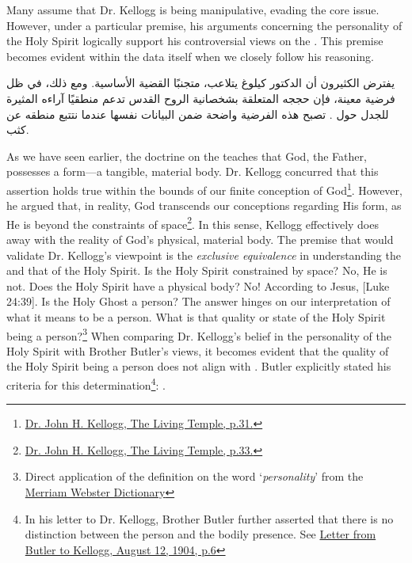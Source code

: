 Many assume that Dr. Kellogg is being manipulative, evading the core issue. However, under a particular premise, his arguments concerning the personality of the Holy Spirit logically support his controversial views on the . This premise becomes evident within the data itself when we closely follow his reasoning.


يفترض الكثيرون أن الدكتور كيلوغ يتلاعب، متجنبًا القضية الأساسية. ومع ذلك، في ظل فرضية معينة، فإن حججه المتعلقة بشخصانية الروح القدس تدعم منطقيًا آراءه المثيرة للجدل حول . تصبح هذه الفرضية واضحة ضمن البيانات نفسها عندما نتتبع منطقه عن كثب.


As we have seen earlier, the doctrine on the  teaches that God, the Father, possesses a form—a tangible, material body. Dr. Kellogg concurred that this assertion holds true within the bounds of our finite conception of God\footnote{\href{https://archive.org/details/J.H.Kellogg.TheLivingTemple1903/page/n33/}{Dr. John H. Kellogg, The Living Temple, p.31.}}. However, he argued that, in reality, God transcends our conceptions regarding His form, as He is beyond the constraints of space\footnote{\href{https://archive.org/details/J.H.Kellogg.TheLivingTemple1903/page/n33/}{Dr. John H. Kellogg, The Living Temple, p.33.}}. In this sense, Kellogg effectively does away with the reality of God’s physical, material body. The premise that would validate Dr. Kellogg’s viewpoint is the \textit{exclusive equivalence} in understanding the  and that of the Holy Spirit. Is the Holy Spirit constrained by space? No, He is not. Does the Holy Spirit have a physical body? No! According to Jesus, [Luke 24:39]. Is the Holy Ghost a person? The answer hinges on our interpretation of what it means to be a person. What is that quality or state of the Holy Spirit being a person?\footnote{Direct application of the definition on the word ‘\textit{personality}’ from the \href{https://www.merriam-webster.com/dictionary/personality}{Merriam Webster Dictionary}} When comparing Dr. Kellogg's belief in the personality of the Holy Spirit with Brother Butler's views, it becomes evident that the quality of the Holy Spirit being a person does not align with . Butler explicitly stated his criteria for this determination\footnote{In his letter to Dr. Kellogg, Brother Butler further asserted that there is no distinction between the person and the bodily presence. See \href{https://c7da.us/egwdl/Butler\%20to\%20Kellogg\%20Aug121904.pdf}{Letter from Butler to Kellogg, August 12, 1904, p.6}}: .


